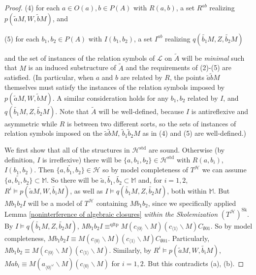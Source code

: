 \documentclass{amsart}
\theoremstyle{definition}
\theoremstyle{remark}
\numberwithin{equation}{section}
\begin{document}
\begin{proof}
    (4) for each $a \in O(a), b \in P(A)$ with $R(a, b)$, a set $R^{ab}$ realizing $p(\tilde{a}M, W, \tilde{b}M)$, and

     (5) for each $ b_1, b_{2} \in P(A)$ with $I(b_{1}, b_{2})$, a set $I^{ab}$ realizing $q(\tilde{b_{1}}M, Z, \tilde{b_{2}}M)$


     and  the set of instances of the relation symbols of $\mathcal{L}$ on $\tilde{A}$ will be \textit{minimal} such that $M$ is an induced substructure of $\tilde{A}$ and the requirements of (2)-(5) are satisfied. (In particular, when $a$ and $b$ are related by $R$, the points $\tilde{a}\tilde{b}M$ themselves must satisfy the instances of the relation symbols imposed by $p(\tilde{a}M, W, \tilde{b}M)$. A similar consideration holds for any $b_{1}, b_{2}$ related by $I$, and $q(\tilde{b_{1}}M, Z, \tilde{b_{2}}M)$. Note that $\tilde{A}$ will be well-defined, because $I$ is antireflexive and asymmetric while $R$ is between two different sorts, so the sets of instances of relation symbols imposed on the $\tilde{a}\tilde{b}M$, $\tilde{b}_{1}\tilde{b}_{2}M$ as in (4) and (5) are well-defined.)

     We first show that all of the structures in $\mathcal{H}^{\mathrm{std}}$ are sound. Otherwise (by definition, $I$ is irreflexive) there will be $\{a, b_1, b_2\} \in \mathcal{H}^{\mathrm{std}}$ with $R(a, b_i)$, $I(b_1, b_2)$. Then $\widetilde{\{a, b_1, b_2\}} \in \mathcal{H}$ so by model completeness of $T^{\mathcal{H}}$ we can assume $\widetilde{\{a, b_1, b_2\}} \subset \mathbb{M}$.  So there will be $\tilde{a}, \tilde{b_{1}}, \tilde{b_{2}} \subset \mathbb{M}$ and, for $i= 1, 2$, $R^{i} \models p(\tilde{a}M, W, \tilde{b_{i}}M)$, as well as $I \models q(\tilde{b_{1}}M, Z, \tilde{b_{2}}M)$, both within $\mathbb{M}$. But $Mb_{1}b_{2}I$ will be a model of $T^{\mathcal{H}}$ containing $Mb_{1}b_{2}$, since we specifically applied Lemma \ref{noninterference of algebraic closures} \textit{within the Skolemization} $(T^{\mathcal{H}})^{\mathrm{Sk}}$. By $I \models q(\tilde{b_{1}}M, Z, \tilde{b_{2}}M)$, $Mb_{1}b_{2}I\equiv^{\mathrm{qftp}} M (c_{\langle0 \rangle}\backslash M) (c_{\langle 1 \rangle}\backslash M)C_{\emptyset 01}$.  So by model completeness, $Mb_{1}b_{2}I\equiv M (c_{\langle0 \rangle}\backslash M) (c_{\langle 1 \rangle}\backslash M)C_{\emptyset 01}$. Particularly, $Mb_{1}b_{2}\equiv M (c_{\langle0 \rangle}\backslash M) (c_{\langle 1 \rangle}\backslash M)$. Similarly, by $R^{i} \models p(\tilde{a}M, W, \tilde{b_{i}}M)$, $Mab_{i}\equiv M (a_{\langle 0 \rangle^{\omega}}\backslash M) (c_{\langle 0 \rangle}\backslash M)$ for $i = 1, 2$. But this contradicts (a), (b).



\end{proof}
\end{document}
